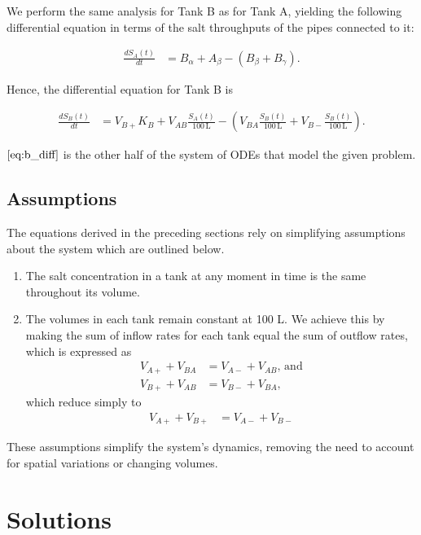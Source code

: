 We perform the same analysis for Tank B as for Tank A, yielding the
following differential equation in terms of the salt throughputs of the
pipes connected to it:

\begin{align}
  \frac{dS_A(t)}{dt} &= B_\alpha + A_\beta - (B_\beta + B_\gamma). \label{eq:b_pipe}
\end{align}

Hence, the differential equation for Tank B is

\begin{align}
  \frac{dS_B(t)}{dt} &= V_{B+} K_B + V_{AB}\frac{S_A(t)}{100\,\text{L}} - \left(V_{BA}\frac{S_B(t)}{100\,\text{L}} + V_{B-}\frac{S_B(t)}{100\,\text{L}}\right). \label{eq:b_diff}
\end{align}

\(\autoref{eq:b_diff}\) is the other half of the system of ODEs that
model the given problem.

\subsection{Assumptions}\label{assumptions}

The equations derived in the preceding sections rely on simplifying
assumptions about the system which are outlined below.

\begin{enumerate}
\def\labelenumi{\arabic{enumi}.}
\tightlist
\item
  The salt concentration in a tank at any moment in time is the same
  throughout its volume.
\item
  The volumes in each tank remain constant at 100 L. We achieve this by
  making the sum of inflow rates for each tank equal the sum of outflow
  rates, which is expressed as \begin{align}
   V_{A+} + V_{BA} &= V_{A-} + V_{AB},\,\text{and} \\
   V_{B+} + V_{AB} &= V_{B-} + V_{BA},
    \end{align} which reduce simply to \begin{align}
   V_{A+} + V_{B+} &= V_{A-} + V_{B-} \label{eq:cons}
    \end{align}
\end{enumerate}

These assumptions simplify the system's dynamics, removing the need to
account for spatial variations or changing volumes.

\section{Solutions}\label{solutions}

